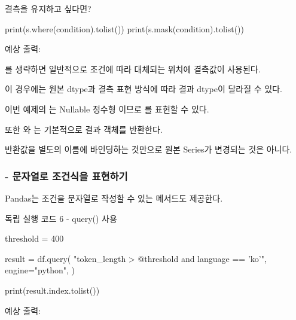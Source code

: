 \begin{dhknote}
\begin{dhksmry}[centered]
결측을 유지하고 싶다면?
\end{dhksmry}
\end{dhknote}

\begin{dhkcode}
print(s.where(condition).tolist())
print(s.mask(condition).tolist())
\end{dhkcode}

예상 출력:

\begin{dhkzsh}
[120, <NA>, <NA>, 300, <NA>]
[<NA>, 420, <NA>, <NA>, 510]
\end{dhkzsh}

를 생략하면 일반적으로 조건에 따라 대체되는 위치에 결측값이 사용된다.

이 경우에는 원본 dtype과 결측 표현 방식에 따라 결과 dtype이 달라질 수 있다.

이번 예제의 는 Nullable 정수형 이므로 를 표현할 수 있다.

또한 와 는 기본적으로 결과 객체를 반환한다.

반환값을 별도의 이름에 바인딩하는 것만으로 원본 Series가 변경되는 것은 아니다.

\subsubsection{ - 문자열로 조건식을 표현하기}

Pandas는 조건을 문자열로 작성할 수 있는  메서드도 제공한다.

\begin{dhknote}
\begin{dhksmry}[centered]
독립 실행 코드 6 - query() 사용
\end{dhksmry}
\end{dhknote}

\begin{dhkcode}
threshold = 400

result = df.query(
    "token_length > @threshold and language == 'ko'",
    engine="python",
)

print(result.index.tolist())
\end{dhkcode}

예상 출력:

\begin{dhkzsh}
['d5']
\end{dhkzsh}

